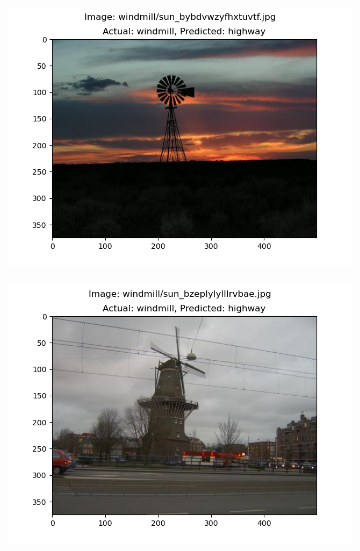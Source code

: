 \documentclass{article} %
\begin{document}
\begin{figure}[h]
\begin{subfigure}[b]{0.333\textwidth}
        \end{subfigure}
        \begin{subfigure}[b]{0.333\textwidth}
            \includegraphics[width=\textwidth]{q2,6_case_147.png}
        \end{subfigure}
        \begin{subfigure}[b]{0.333\textwidth}
            \includegraphics[width=\textwidth]{q2,6_case_154.png}
        \end{subfigure}
        \begin{subfigure}[b]{0.333\textwidth}

\end{subfigure}
\end{figure}
\end{document}
